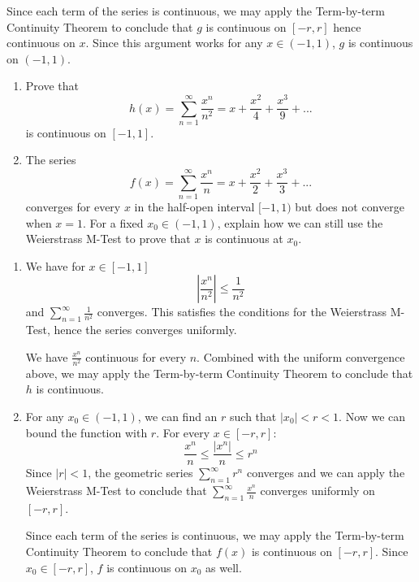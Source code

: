 \documentclass{oxmathproblems}
\begin{document}
\begin{questions}
\begin{solution}
  Since each term of the series is continuous, we may apply the Term-by-term Continuity Theorem to conclude that $g$ is continuous on $[-r, r]$ hence continuous on $x$.
  Since this argument works for any $x \in (-1, 1)$, $g$ is continuous on $(-1, 1)$.

\end{solution}

\miquestion 
\begin{enumerate}[label=(\alph*)]
  \item Prove that
  \[h(x) = \sum_{n=1}^{\infty}\frac{x^n}{n^2} = x + \frac{x^2}{4} + \frac{x^3}{9} + ...\]
  is continuous on $[-1, 1]$.

  \item The series
  \[f(x) = \sum_{n=1}^{\infty}\frac{x^n}{n} = x + \frac{x^2}{2} + \frac{x^3}{3} + ...\]
  converges for every $x$ in the half-open interval $[-1, 1)$ but does not converge when $x=1$. For a fixed $x_{0} \in (-1, 1)$, explain how we can
  still use the Weierstrass M-Test to prove that $x$ is continuous at $x_{0}$.
\end{enumerate}

\begin{solution}
  \begin{enumerate}[label=(\alph*)]
    \item We have for $x \in [-1, 1]$
    \[\left|\frac{x^n}{n^2}\right| \leq \frac{1}{n^2}\]
    and $\sum_{n=1}^{\infty}\frac{1}{n^2}$ converges. This satisfies the conditions for the Weierstrass M-Test, hence the series converges uniformly.

    We have $\frac{x^n}{n^2}$ continuous for every $n$. Combined with the uniform convergence above, we may apply
    the Term-by-term Continuity Theorem to conclude that $h$ is continuous.

    \item For any $x_{0} \in (-1, 1)$, we can find an $r$ such that $|x_{0}| < r < 1$. Now we can bound the function with $r$. For every $x \in [-r, r]$:
    \[\frac{x^{n}}{n} \leq \frac{|x^n|}{n} \leq r^{n}\]
    Since $|r| < 1$, the geometric series $\sum_{n=1}^{\infty}r^{n}$ converges and we can apply the Weierstrass M-Test to conclude that
    $\sum_{n=1}^{\infty}\frac{x^n}{n}$ converges uniformly on $[-r, r]$.

    Since each term of the series is continuous, we may apply the Term-by-term Continuity Theorem to conclude that
    $f(x)$ is continuous on $[-r, r]$. Since $x_{0} \in [-r, r]$, $f$ is continuous on $x_{0}$ as well.
  \end{enumerate}
\end{solution}


\end{questions}
\end{document}
